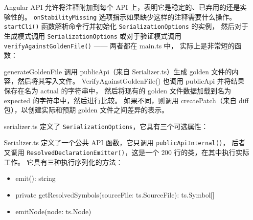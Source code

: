 Angular API 允许将注释附加到每个 API 上，表明它是稳定的、已弃用的还是实验性的。
\texttt{onStabilityMissing} 选项指示如果缺少这样的注释需要什么操作。
\texttt{startCli()} 函数解析命令行并初始化 \texttt{SerializationOptions} 的实例，
然后对于生成模式调用 \texttt{SerializationOptions} 或对于验证模式调用
\texttt{verifyAgainstGoldenFile()} —— 两者都在 main.ts 中，
实际上是非常短的函数：




generateGoldenFile 调用 publicApi（来自 Serializer.ts）生成 golden 文件的内容，然后将其写入文件。
VerifyAgainstGoldenFile() 也调用 publicApi 并将结果保存在名为 actual 的字符串中，
然后将现有的 golden 文件数据加载到名为 expected 的字符串中，然后进行比较。
如果不同，则调用 createPatch（来自 diff 包），以创建实际和预期 golden 文件之间差异的表示。




serializer.ts 定义了 \texttt{SerializationOptions}，它具有三个可选属性：




Serializer.ts 定义了一个公共 API 函数，它只调用 \texttt{publicApiInternal()}，
后者又调用 \texttt{ResolvedDeclarationEmitter()}，这是一个 200 行的类，在其中执行实际工作。
它具有三种执行序列化的方法：

\begin{itemize}
  \item emit(): string
  \item private getResolvedSymbols(sourceFile: ts.SourceFile): ts.Symbol[]
  \item emitNode(node: ts.Node)
\end{itemize}
